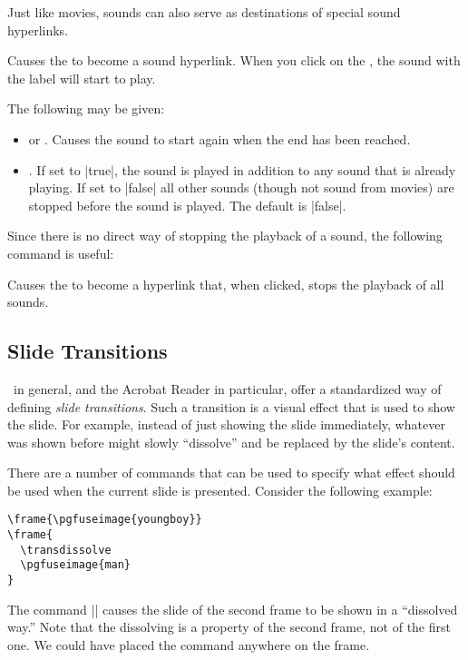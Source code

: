 Just like movies, sounds can also serve as  destinations of special sound hyperlinks.

\begin{command}{\hyperlinksound{}}
  Causes the  to become a sound hyperlink. When you click on the , the sound with the label  will start to play.

  The following  may be given:
  \begin{itemize}
  \item
     or . Causes the sound to start again when the end has been reached.
  \item
    . If set to |true|, the sound is played in addition to any sound that is already playing. If set to |false| all other sounds (though not sound from movies) are stopped before the sound is played. The default is |false|.
  \end{itemize}
\end{command}

Since there is no direct way of stopping the playback of a sound, the following command is useful:

\begin{command}{\hyperlinkmute{}}
  Causes the  to become a hyperlink that, when clicked, stops the playback of all sounds.
\end{command}


\subsection{Slide Transitions}

\pdf\ in general, and the Acrobat Reader in particular, offer a standardized way of defining \emph{slide transitions}. Such a transition is a visual effect that is used to show the slide. For example, instead of just showing the slide immediately, whatever was shown before might slowly ``dissolve'' and be replaced by the slide's content.

There are a number of commands that can be used to specify what effect should be used when the current slide is presented. Consider the following example:
\begin{verbatim}
\frame{\pgfuseimage{youngboy}}
\frame{
  \transdissolve
  \pgfuseimage{man}
}
\end{verbatim}
The command |\transdissolve| causes the slide of the second frame to be shown in a ``dissolved way.'' Note that the dissolving is a property of the second frame, not of the first one. We could have placed the command anywhere on the frame.

